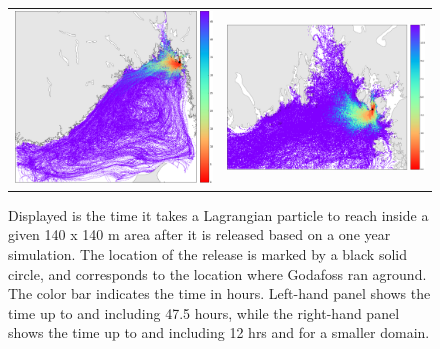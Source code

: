 \begin{figure}[hbt]
  \begin{center}
    \begin{tabular}{cc}
      \includegraphics*[width=7.2cm]{Figurer/opendrift/opendrift_godafoss_shortest_time_crop}  & \includegraphics*[width=7.2cm]{Figurer/opendrift/opendrift_godafoss_shortest_time_zoom_crop}\\ 
    \end{tabular}
    \caption{\small Displayed is the time it takes a Lagrangian particle to reach inside a given 140 x 140 m area after it is released based on a one year simulation. The location of the release is marked by a black solid circle, and corresponds to the location where Godafoss ran aground. The color bar indicates the time in hours. Left-hand panel shows the time up to and including 47.5 hours, while the right-hand panel shows the time up to and including 12 hrs and for a smaller domain.}
    \label{fig:opendrift_godafoss_time}
  \end{center}
\end{figure}

